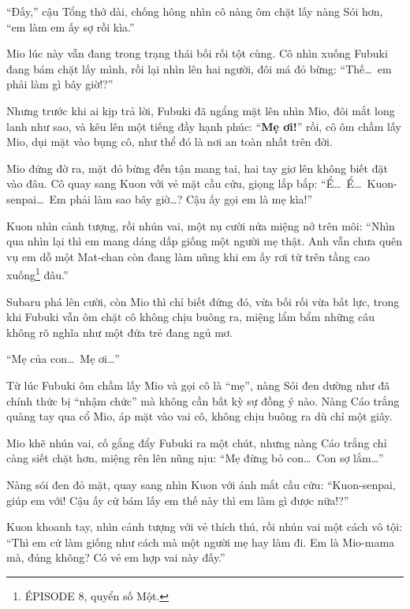 \documentclass[../main.tex]{subfiles}
\begin{document}
``Đấy,'' cậu Tổng thở dài, chống hông nhìn cô nàng ôm chặt lấy nàng Sói hơn, ``em làm em ấy sợ rồi kìa.''

Mio lúc này vẫn đang trong trạng thái bối rối tột cùng. Cô nhìn xuống Fubuki đang bám chặt lấy mình, rồi lại nhìn lên hai người, đôi má đỏ bừng: ``Thế\dots\ em phải làm gì bây giờ!?''

Nhưng trước khi ai kịp trả lời, Fubuki đã ngẩng mặt lên nhìn Mio, đôi mắt long lanh như sao, và kêu lên một tiếng đầy hạnh phúc: ``\textbf{Mẹ ơi!}'' rồi, cô ôm chầm lấy Mio, dụi mặt vào bụng cô, như thể đó là nơi an toàn nhất trên đời.


Mio đứng đờ ra, mặt đỏ bừng đến tận mang tai, hai tay giơ lên không biết đặt vào đâu. Cô quay sang Kuon với vẻ mặt cầu cứu, giọng lắp bắp: ``Ể\dots\ Ể\dots\ Kuon-senpai\dots\ Em phải làm sao bây giờ\dots? Cậu ấy gọi em là mẹ kìa!''

Kuon nhìn cảnh tượng, rồi nhún vai, một nụ cười nửa miệng nở trên môi: ``Nhìn qua nhìn lại thì em mang dáng dấp giống một người mẹ thật. Anh vẫn chưa quên vụ em dỗ một Mat-chan còn đang làm nũng khi em ấy rơi từ trên tầng cao xuống\footnote{{\flaregothic ÉPISODE 8}, quyển số Một.} đâu.''

Subaru phá lên cười, còn Mio thì chỉ biết đứng đó, vừa bối rối vừa bất lực, trong khi Fubuki vẫn ôm chặt cô không chịu buông ra, miệng lẩm bẩm những câu không rõ nghĩa như một đứa trẻ đang ngủ mơ.

``Mẹ của con\dots\ Mẹ ơi\dots''

\ct

Từ lúc Fubuki ôm chầm lấy Mio và gọi cô là ``mẹ'', nàng Sói đen dường như đã chính thức bị ``nhậm chức'' mà không cần bất kỳ sự đồng ý nào. Nàng Cáo trắng quàng tay qua cổ Mio, áp mặt vào vai cô, không chịu buông ra dù chỉ một giây.


Mio khẽ nhún vai, cố gắng đẩy Fubuki ra một chút, nhưng nàng Cáo trắng chỉ càng siết chặt hơn, miệng rên lên nũng nịu: ``Mẹ đừng bỏ con\dots\ Con sợ lắm\dots''

Nàng sói đen đỏ mặt, quay sang nhìn Kuon với ánh mắt cầu cứu: ``Kuon-senpai, giúp em với! Cậu ấy cứ bám lấy em thế này thì em làm gì được nữa!?''

Kuon khoanh tay, nhìn cảnh tượng với vẻ thích thú, rồi nhún vai một cách vô tội: ``Thì em cứ làm giống như cách mà một người mẹ hay làm đi. Em là Mio-mama mà, đúng không? Có vẻ em hợp vai này đấy.''
\end{document}
